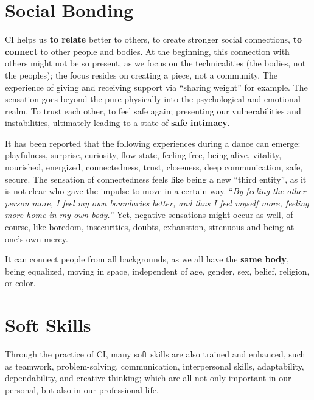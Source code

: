 \section{Social Bonding}\label{sec:social-bonding}

CI helps us \textbf{to relate} better to others, to create stronger social connections, \textbf{to connect} to other people and bodies.
At the beginning, this connection with others might not be so present, as we focus on the technicalities (the bodies, not the peoples); the focus resides on creating a piece, not a community.
The experience of giving and receiving support via ``sharing weight'' for example.
The sensation goes beyond the pure physically into the psychological and emotional realm.
To trust each other, to feel safe again; presenting our vulnerabilities and instabilities, ultimately leading to a state of \textbf{safe intimacy}.

It has been reported that the following experiences during a dance can emerge: playfulness, surprise, curiosity, flow state, feeling free, being alive, vitality, nourished, energized, connectedness, trust, closeness, deep communication, safe, secure.
The sensation of connectedness feels like being a new ``third entity'', as it is not clear who gave the impulse to move in a certain way.
``\textit{By feeling the other person more, I feel my own boundaries better, and thus I feel myself more, feeling more home in my own body.}''
Yet, negative sensations might occur as well, of course, like boredom, insecurities, doubts, exhaustion, strenuous and being at one's own mercy.

It can connect people from all backgrounds, as we all have the \textbf{same body}, being equalized, moving in space, independent of age, gender, sex, belief, religion, or color.

\section{Soft Skills}\label{sec:soft-skills}

Through the practice of CI, many soft skills are also trained and enhanced, such as teamwork, problem-solving, communication, interpersonal skills, adaptability, dependability, and creative thinking; which are all not only important in our personal, but also in our professional life.

